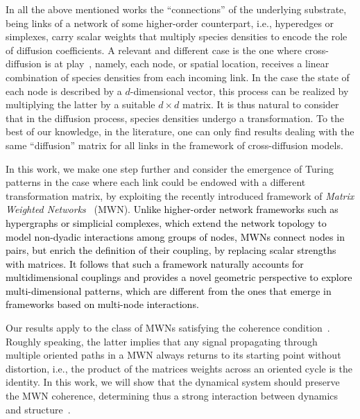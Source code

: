 \documentclass[aps,showpacs,preprintnumbers,amsmath,amssymb,twocolumn,superscriptaddress,floatfix,nofootinbib,10pt,pre]{revtex4-1}
\begin{document}
In all the above mentioned works the ``connections'' of the underlying substrate, being links of a network of some higher-order counterpart, i.e., hyperedges or simplexes, carry scalar weights that multiply species densities to encode the role of diffusion coefficients. A relevant and different case is the one where cross-diffusion is at play~\cite{GAMBINO20121112,fanelli_cianci,Gao_2020,cnad052}, namely, each node, or spatial location, receives a linear combination of species densities from each incoming link. In the case the state of each node is described by a $d$-dimensional vector, this process can be realized by multiplying the latter by a suitable $d\times d$ matrix. It is thus natural to consider that in the diffusion process, species densities undergo a transformation. To the best of our knowledge, in the literature, one can only find results dealing with the same ``diffusion'' matrix for all links in the framework of cross-diffusion models. 

In this work, we make one step further and consider the emergence of Turing patterns in the case where each link could be endowed with a different transformation matrix, by exploiting the recently introduced framework of \textit{Matrix Weighted Networks}~\cite{tian2025matrix,gallo2025global} (MWN).
\textcolor{black}{Unlike higher-order network frameworks such as hypergraphs or simplicial complexes, which extend the network topology to model non-dyadic interactions among groups of nodes, MWNs connect nodes in pairs, but enrich the definition of their coupling, by replacing scalar strengths with matrices. It follows that such a framework naturally accounts for multidimensional couplings and provides a novel geometric perspective to explore multi-dimensional patterns, which are different from the ones that emerge in frameworks based on multi-node interactions.
}

Our results apply to the class of MWNs satisfying the coherence condition~\cite{tian2025matrix}. Roughly speaking, the latter implies that any signal propagating through multiple oriented paths in a MWN always returns to its starting point without distortion, i.e., the product of the matrices weights across an oriented cycle is the identity. In this work, we will show that the dynamical system should preserve the MWN coherence, determining thus a strong interaction between dynamics and structure~\cite{MillanEtAl2025}. 
\end{document}

